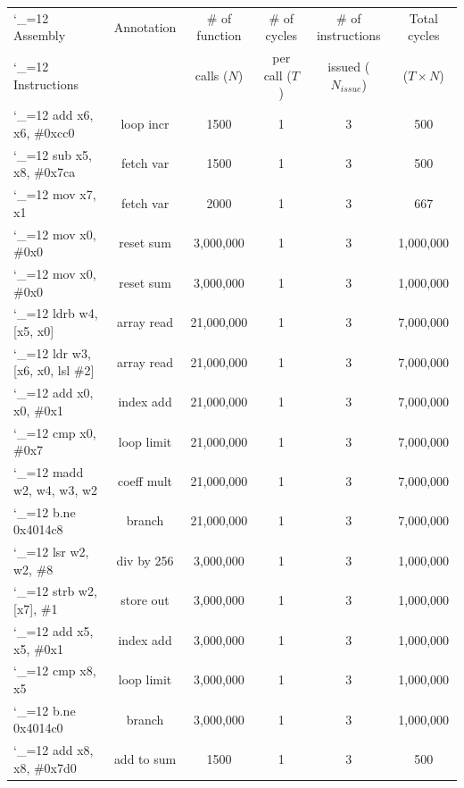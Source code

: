 \documentclass[
  course = {{ESE532 System-on-a-Chip}},
  quartile = {{}},
  assignment = 2,
  name = {{Sheil Sarda}},
  studentnumber = {{}},
  email = {{sheils@seas.upenn.edu}},
  firstexercise = 1
]{aga-homework}
\begin{document}
\subexercise
\begin{center}
  \begin{tabular}{|| >{\ttfamily\catcode`_=12 }l | c | c | c | c | c ||} 
    \hline
    Assembly   & Annotation  & $\#$ of function   & $\#$ of cycles & $\#$ of instructions & Total cycles  \\ [0.5ex] 
    Instructions&         & calls ($N$)    & per call ($T$) & issued ($N_{issue}$)    & ($T \times N$)\\ [0.5ex] 
    \hline\hline
    add     x6, x6, \#0xcc0      & loop incr   &    1500  &1    &3    & 500  \\ 
    sub     x5, x8, \#0x7ca      &  fetch var    &  1500    &1  &3    &  500  \\ 
    mov     x7, x1      & fetch var     &  2000   &1   &3    & 667  \\ 
    mov     x0, \#0x0      & reset sum     &   3,000,000   &1    &3    & 1,000,000  \\ 
    mov     x0, \#0x0       &   reset sum   &  3,000,000    &1   &3    & 1,000,000   \\ 
    ldrb    w4, [x5, x0]      &   array read   & 21,000,000     &1  &3    & 7,000,000  \\ 
    ldr     w3, [x6, x0, lsl \#2]      &  array read    & 21,000,000      &1  &3    & 7,000,000  \\ 
    add     x0, x0, \#0x1      & index add     & 21,000,000      &1    &3   & 7,000,000  \\ 
    cmp     x0, \#0x7      & loop limit     &  21,000,000    &1    &3    & 7,000,000  \\ 
    madd    w2, w4, w3, w2      &  coeff mult     &  21,000,000    &1   &3    & 7,000,000  \\ 
    b.ne    0x4014c8      &  branch    &  21,000,000     &1  &3    &7,000,000   \\ 
    lsr     w2, w2, \#8     & div by 256      & 3,000,000    &1  &3    & 1,000,000  \\ 
    strb    w2, [x7], \#1      & store out  &   3,000,000  &1  &3  & 1,000,000  \\ 
    add     x5, x5, \#0x1      &  index add    &  3,000,000   &1  &3    & 1,000,000  \\ 
    cmp     x8, x5      & loop limit      &  3,000,000   &1    &3  &  1,000,000 \\ 
    b.ne    0x4014c0      &  branch    &  3,000,000   &1   &3   & 1,000,000  \\ 
    add     x8, x8, \#0x7d0     &  add to sum    &  1500     &1  &3    &  500 \\ 

\end{tabular}
\end{center}
\end{document}
